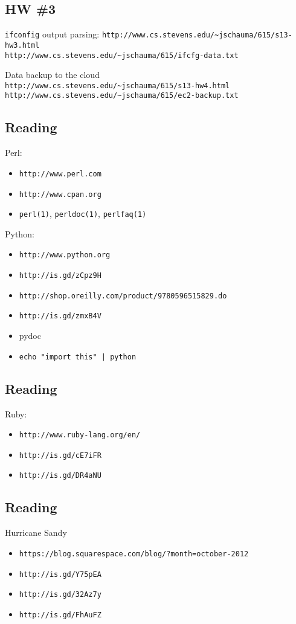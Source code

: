 \documentclass[xga]{xdvislides}
\begin{document}
\subsection{HW \#3}
{\tt ifconfig} output parsing:
\verb+http://www.cs.stevens.edu/~jschauma/615/s13-hw3.html+
\\
\verb+http://www.cs.stevens.edu/~jschauma/615/ifcfg-data.txt+
\\
\vspace{.5in}

Data backup to the cloud \\
\verb+http://www.cs.stevens.edu/~jschauma/615/s13-hw4.html+
\\
\verb+http://www.cs.stevens.edu/~jschauma/615/ec2-backup.txt+

\subsection{Reading}
Perl:
\begin{itemize}
	\item \verb+http://www.perl.com+
	\item \verb+http://www.cpan.org+
	\item \verb+perl(1)+, \verb+perldoc(1)+, \verb+perlfaq(1)+
\end{itemize}
Python:
\begin{itemize}
	\item \verb+http://www.python.org+
	\item \verb+http://is.gd/zCpz9H+
	\item \verb+http://shop.oreilly.com/product/9780596515829.do+
	\item \verb+http://is.gd/zmxB4V+
	\item pydoc
	\item \verb+echo "import this" | python+
\end{itemize}

\subsection{Reading}
Ruby:
\begin{itemize}
	\item \verb+http://www.ruby-lang.org/en/+
	\item \verb+http://is.gd/cE7iFR+
	\item \verb+http://is.gd/DR4aNU+
\end{itemize}

\subsection{Reading}
Hurricane Sandy
\begin{itemize}
	\item \verb+https://blog.squarespace.com/blog/?month=october-2012+
	\item \verb+http://is.gd/Y75pEA+
	\item \verb+http://is.gd/32Az7y+
	\item \verb+http://is.gd/FhAuFZ+
\end{itemize}
\end{document}
